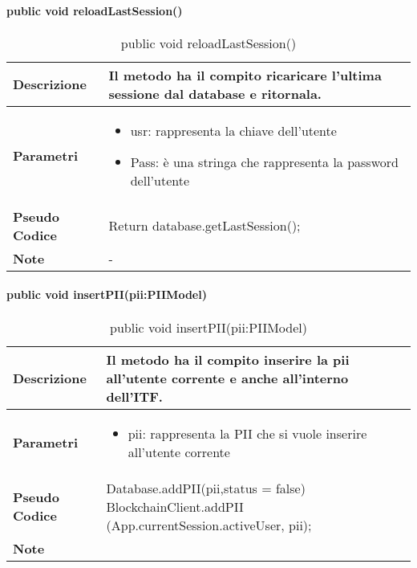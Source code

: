 \paragraph{public void reloadLastSession()}
\begin{center}
    \begin{longtable}{|p{3cm}|p{9cm}|}%
    \caption{public void reloadLastSession()}
    \endfirsthead
    \endhead
    \hline
    \textbf{Descrizione} & Il metodo ha il compito ricaricare l’ultima sessione dal database e ritornala.\\
    \hline
    \textbf{Parametri} &      
    \begin{itemize}
        \item  usr: rappresenta la chiave dell’utente
        \item Pass: è una stringa che rappresenta la password dell’utente
    \end{itemize}
    \\
    \hline
    \textbf{Pseudo Codice} & 
    Return database.getLastSession();
    \\
    \hline
    \textbf{Note} & 
    -
    \\
    \hline
    \end{longtable}
    \end{center}



\paragraph{public void insertPII(pii:PIIModel)}
\begin{center}
    \begin{longtable}{|p{3cm}|p{9cm}|}%
    \caption{public void insertPII(pii:PIIModel)}
    \endfirsthead
    \endhead
    \hline
    \textbf{Descrizione} & Il metodo ha il compito inserire la pii all’utente corrente e anche all’interno dell’ITF.\\
    \hline
    \textbf{Parametri} &      
    \begin{itemize}
        \item pii: rappresenta la PII che si vuole inserire all’utente corrente
    \end{itemize}
    \\
    \hline
    \textbf{Pseudo Codice} & 
    Database.addPII(pii,status = false)\newline
    BlockchainClient.addPII\newline
    (App.currentSession.activeUser, pii);\newline
    \\
    \hline
    \textbf{Note} & 
    \\
    \hline
    \end{longtable}
    \end{center}


